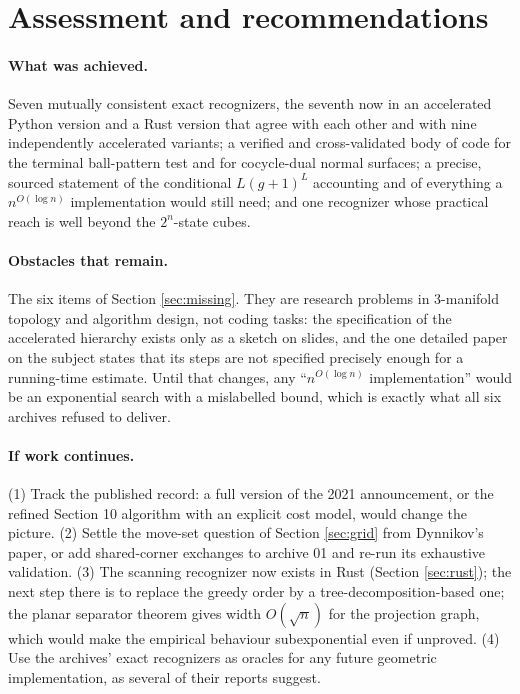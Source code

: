 \documentclass[11pt]{article}
\theoremstyle{remark}
\newcommand{\qp}{n^{O(\log n)}}
\begin{document}






\section{Assessment and recommendations}

\paragraph{What was achieved.}
Seven mutually consistent exact recognizers, the seventh now in an
accelerated Python version and a Rust version that agree with each other and
with nine independently accelerated variants; a verified and cross-validated
body of code for the terminal ball-pattern test and for cocycle-dual normal
surfaces; a precise, sourced statement of the conditional
$L(g+1)^L$ accounting and of everything a $\qp$ implementation would still
need; and one recognizer whose practical reach is well beyond the
$2^n$-state cubes.

\paragraph{Obstacles that remain.}
The six items of Section \ref{sec:missing}. They are research problems in
3-manifold topology and algorithm design, not coding tasks: the specification
of the accelerated hierarchy exists only as a sketch on slides, and the one
detailed paper on the subject states that its steps are not specified
precisely enough for a running-time estimate. Until that changes, any
``$\qp$ implementation'' would be an exponential search with a mislabelled
bound, which is exactly what all six archives refused to deliver.

\paragraph{If work continues.}
(1) Track the published record: a full version of the 2021 announcement, or
the refined Section 10 algorithm with an explicit cost model, would change the
picture. (2) Settle the move-set question of Section \ref{sec:grid} from
Dynnikov's paper, or add shared-corner exchanges to archive 01 and re-run its
exhaustive validation. (3) The scanning recognizer now exists in Rust (Section \ref{sec:rust});
the next step there is to replace the greedy order by a
tree-decomposition-based one; the
planar separator theorem gives width $O(\sqrt n)$ for the projection graph,
which would make the empirical behaviour subexponential even if unproved.
(4) Use the archives' exact recognizers as oracles for any future geometric
implementation, as several of their reports suggest.
\end{document}
